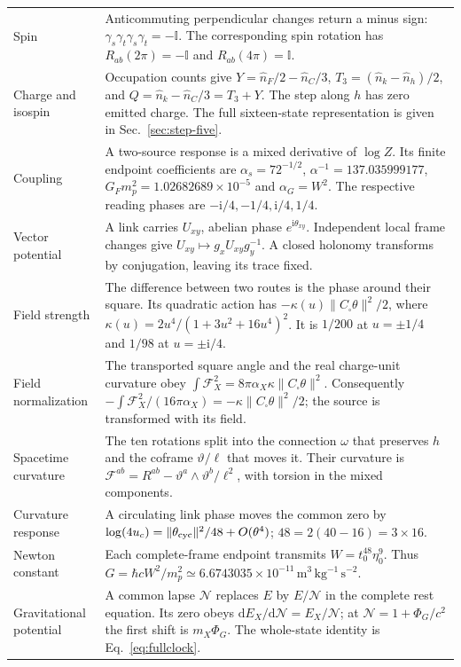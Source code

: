 \documentclass[aps,prx,onecolumn,10pt,notitlepage,nofootinbib,longbibliography]{revtex4-2}
\numberwithin{equation}{section}
\numberwithin{table}{section}
\newcommand{\Id}{\mathbb I}
\newcommand{\dd}{\mathrm d}
\newcommand{\ii}{\mathrm i}
\begin{document}
\begin{longtable}{@{}>{\raggedright\arraybackslash}p{}>{\raggedright\arraybackslash}p{}@{}}
Spin&Anticommuting perpendicular changes return a minus sign: $\gamma_s\gamma_t\gamma_s\gamma_t=-\Id$. The corresponding spin rotation has $R_{ab}(2\pi)=-\Id$ and $R_{ab}(4\pi)=\Id$.\\[4pt]
Charge and isospin&Occupation counts give $Y=\widehat n_F/2-\widehat n_C/3$, $T_3=(\widehat n_k-\widehat n_h)/2$, and $Q=\widehat n_k-\widehat n_C/3=T_3+Y$. The step along $h$ has zero emitted charge. The full sixteen-state representation is given in Sec.~\ref{sec:step-five}.\\[4pt]
Coupling&A two-source response is a mixed derivative of $\log Z$. Its finite endpoint coefficients are $\alpha_s=72^{-1/2}$, $\alpha^{-1}=137.035999177$, $G_Fm_p^2=1.02682689\times10^{-5}$ and $\alpha_G=W^2$. The respective reading phases are $-\ii/4,-1/4,\ii/4,1/4$.\\[4pt]
Vector potential&A link carries $U_{xy}$, abelian phase $e^{\ii\theta_{xy}}$. Independent local frame changes give $U_{xy}\mapsto g_xU_{xy}g_y^{-1}$. A closed holonomy transforms by conjugation, leaving its trace fixed.\\[4pt]
Field strength&The difference between two routes is the phase around their square. Its quadratic action has $-\kappa(u)\|C_\square\theta\|^2/2$, where $\kappa(u)=2u^4/(1+3u^2+16u^4)^2$. It is $1/200$ at $u=\pm1/4$ and $1/98$ at $u=\pm\ii/4$.\\[4pt]
Field normalization&The transported square angle and the real charge-unit curvature obey $\int\mathcal F_X^2=8\pi\alpha_X\kappa\|C_\square\theta\|^2$. Consequently $-\int\mathcal F_X^2/(16\pi\alpha_X)=-\kappa\|C_\square\theta\|^2/2$; the source is transformed with its field.\\[4pt]
Spacetime curvature&The ten rotations split into the connection $\omega$ that preserves $h$ and the coframe $\vartheta/\ell$ that moves it. Their curvature is $\mathcal F^{ab}=R^{ab}-\vartheta^a\wedge \vartheta^b/\ell^2$, with torsion in the mixed components.\\[4pt]
Curvature response&A circulating link phase moves the common zero by $\log(4u_c)=\|\theta_{\rm cyc}\|^2/48+O(\theta^4)$; $48=2(40-16)=3\times16$.\\[4pt]
Newton constant&Each complete-frame endpoint transmits $W=t_0^{48}\eta_0^9$. Thus $G=\hbar cW^2/m_p^2\simeq6.6743035\times10^{-11}\,\mathrm{m^3\,kg^{-1}\,s^{-2}}$.\\[4pt]
Gravitational potential&A common lapse $\mathcal N$ replaces $E$ by $E/\mathcal N$ in the complete rest equation. Its zero obeys $\dd E_X/\dd\mathcal N=E_X/\mathcal N$; at $\mathcal N=1+\Phi_G/c^2$ the first shift is $m_X\Phi_G$. The whole-state identity is Eq.~\eqref{eq:fullclock}.\\[4pt]

\end{longtable}
\end{document}

